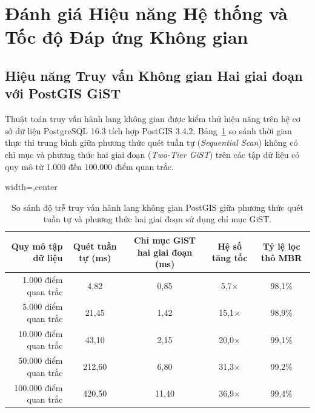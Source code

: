 \section{Đánh giá Hiệu năng Hệ thống và Tốc độ Đáp ứng Không gian}
\label{sec:system_performance}

\subsection{Hiệu năng Truy vấn Không gian Hai giai đoạn với PostGIS GiST}
Thuật toán truy vấn hành lang không gian được kiểm thử hiệu năng trên hệ cơ sở dữ liệu PostgreSQL 16.3 tích hợp PostGIS 3.4.2. Bảng~\ref{tab:gist_benchmark_vi} so sánh thời gian thực thi trung bình giữa phương thức quét tuần tự (\textit{Sequential Scan}) không có chỉ mục và phương thức hai giai đoạn (\textit{Two-Tier GiST}) trên các tập dữ liệu có quy mô từ 1.000 đến 100.000 điểm quan trắc.

\begin{table}[htbp]
\centering
\caption[So sánh hiệu năng truy vấn không gian PostGIS]{So sánh độ trễ truy vấn hành lang không gian PostGIS giữa phương thức quét tuần tự và phương thức hai giai đoạn sử dụng chỉ mục GiST.}
\label{tab:gist_benchmark_vi}
\begin{adjustbox}{width=\textwidth,center}
\begin{tabular}{rcccc}
\toprule
\textbf{Quy mô tập dữ liệu} & \textbf{Quét tuần tự (ms)} & \textbf{Chỉ mục GiST hai giai đoạn (ms)} & \textbf{Hệ số tăng tốc} & \textbf{Tỷ lệ lọc thô MBR} \\
\midrule
1.000 điểm quan trắc   & 4,82   & 0,85  & 5,7$\times$  & 98,1\% \\
5.000 điểm quan trắc   & 21,45  & 1,42  & 15,1$\times$ & 98,9\% \\
10.000 điểm quan trắc  & 43,10  & 2,15  & 20,0$\times$ & 99,1\% \\
50.000 điểm quan trắc  & 212,60 & 6,80  & 31,3$\times$ & 99,2\% \\
100.000 điểm quan trắc & 420,50 & 11,40 & 36,9$\times$ & 99,4\% \\
\bottomrule
\end{tabular}
\end{adjustbox}
\end{table}

